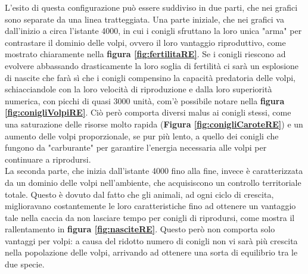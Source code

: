 \documentclass[11pt]{article}
\begin{document}
L'esito di questa configurazione può essere suddiviso in due parti, che nei grafici sono separate da una linea tratteggiata. Una parte iniziale, che nei grafici va dall'inizio a circa l'istante 4000, in cui i conigli sfruttano la loro unica "arma" per contrastare il dominio delle volpi, ovvero il loro vantaggio riproduttivo, come mostrato chiaramente nella \textbf{figura \ref{fig:fertilitaRE}}. Se i conigli riescono ad evolvere abbassando drasticamente la loro soglia di fertilità ci sarà un esplosione di nascite che farà sì che i conigli compensino la capacità predatoria delle volpi, schiacciandole con la loro velocità di riproduzione e dalla loro superiorità numerica, con picchi di quasi 3000 unità, com'è possibile notare nella \textbf{figura \ref{fig:conigliVolpiRE}}.
Ciò però comporta diversi malus ai conigli stessi, come una saturazione delle risorse molto rapida (\textbf{Figura \ref{fig:conigliCaroteRE}}) e un aumento delle volpi proporzionale, se pur più lento, a quello dei conigli che fungono da "carburante" per garantire l'energia necessaria alle volpi per continuare a riprodursi. \\
La seconda parte, che inizia dall'istante 4000 fino alla fine, invece è caratterizzata da un dominio delle volpi nell'ambiente, che acquisiscono un controllo territoriale totale. Questo è dovuto dal fatto che gli animali, ad ogni ciclo di crescita, miglioravano costantemente le loro caratteristiche fino ad ottenere un vantaggio tale nella caccia da non lasciare tempo per conigli di riprodursi, come mostra il rallentamento in \textbf{figura \ref{fig:nasciteRE}}. Questo però non comporta solo vantaggi per volpi: a causa del ridotto numero di conigli non vi sarà più crescita nella popolazione delle volpi, arrivando ad ottenere una sorta di equilibrio tra le due specie.

\newpage
\end{document}
